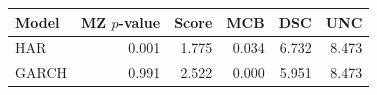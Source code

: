 
\begin{tabular}[t]{lrrrrr}
\toprule
Model & MZ $p$-value & Score & MCB & DSC & UNC\\
\midrule
HAR & 0.001 & 1.775 & 0.034 & 6.732 & 8.473\\
GARCH & 0.991 & 2.522 & 0.000 & 5.951 & 8.473\\
\bottomrule
\end{tabular}
